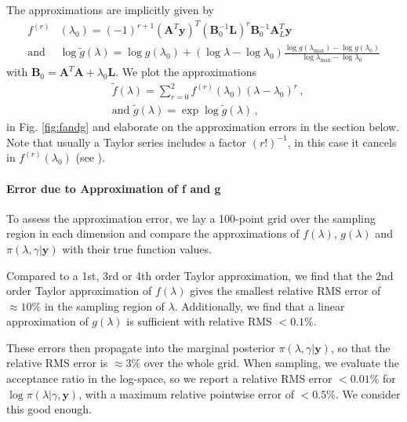 The approximations are implicitly given by
\begin{align}
	f^{(r)}& (\lambda_0)= (-1)^{r+1} (\bm{A}^T \bm{y})^T (\bm{B}_0^{-1} \bm{L})^r \bm{B}_0^{-1} \bm{A}_L^T \bm{y} \label{eq:ftay}  \\
	\text{and } & \log{ \tilde{g}(\lambda)} = \log{ g(\lambda_{0})} + (\log{\lambda} - \log{\lambda_{0}})  \frac{ \log{g(\lambda_{\text{max}})} - \log{g(\lambda_{0})} }{\log{\lambda_{\text{max}}} - \log{\lambda_{0}} } 
	\label{eq:gtay}
\end{align} 
with $\bm{B}_0 = \bm{A}^T  \bm{A} + \lambda_0 \bm{L}$.
We plot the approximations
\begin{subequations}
	\label{eq:fandgapprox}
	\begin{align}
		&\tilde{f} ( \lambda) = \sum^2_{r=0} 	f^{(r)}(\lambda_0) (\lambda-\lambda_0)^r  \label{eq:fAprox} \, ,  \\
		&\text{and } \tilde{g} (\lambda) = \exp \log{\tilde{g}(\lambda)}  \label{eq:gAprox} \, ,
	\end{align}
\end{subequations} in Fig. \ref{fig:fandg} and elaborate on the approximation errors in the section below.
Note that usually a Taylor series includes a factor $(r!)^{-1}$, in this case it cancels in $f^{(r)}(\lambda_0)$ (see \cite{fox2016fast}).

\paragraph{Error due to Approximation of f and g}
To assess the approximation error, we lay a 100-point grid over the sampling region in each dimension and compare the approximations of $f(\lambda)$, $g(\lambda)$ and $\pi(\lambda, \gamma | \bm{y})$ with their true function values.

Compared to a 1st, 3rd or 4th order Taylor approximation, we find that the 2nd order Taylor approximation of $f(\lambda)$ gives the smallest relative RMS error of $\approx 10 \%$ in the sampling region of $\lambda$.
Additionally, we find that a linear approximation of $g(\lambda)$ is sufficient with relative RMS $<0.1\%$.

These errors then propagate into the marginal posterior $\pi(\lambda , \gamma| \bm{y})$, so that the relative RMS error is $\approx 3 \%$ over the whole grid.
When sampling, we evaluate the acceptance ratio in the log-space, so we report a relative RMS error $< 0.01\%$ for $\log{\pi(\lambda| \gamma, \bm{y})}$, with a maximum relative pointwise error of $< 0.5\%$.
We consider this good enough.

